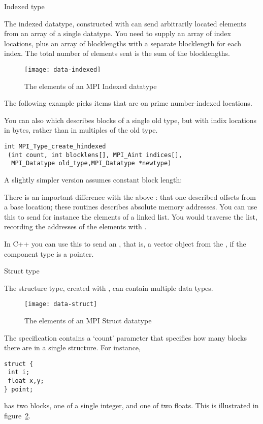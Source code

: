  {Indexed type}
\label{sec:data:indexed}

The indexed datatype, constructed with 
can send arbitrarily located elements from an array of a single datatype.
You need to supply an array of index locations, plus an array of blocklengths
with a separate blocklength for each index. The total number of elements sent
is the sum of the blocklengths.
%
%

\begin{figure}[ht]
  \texttt{[image: data-indexed]}
  \caption{The elements of an MPI Indexed datatype}
  \label{fig:data-indexed}
\end{figure}

The following example picks items that are on prime number-indexed
locations.
%
%

You can also  which describes blocks
of a single old type, but with indix locations in bytes, rather than
in multiples of the old type.
\begin{lstlisting}
int MPI_Type_create_hindexed
 (int count, int blocklens[], MPI_Aint indices[],
  MPI_Datatype old_type,MPI_Datatype *newtype)
\end{lstlisting}
A slightly simpler version assumes constant block length:
%

There is an important difference with the above :
that one described offsets from a base location; these routines
describes absolute memory addresses.
You can use this to send for instance the elements of a
linked list. You would traverse the list, recording the addresses of
the elements with .


In C++ you can use this to
send an , that
is, a vector object from the , if
the component type is a pointer.

 {Struct type}
\label{sec:data:struct}

The structure type, created with ,
can contain multiple data types.
%
\begin{figure}[ht]
  \texttt{[image: data-struct]}
  \caption{The elements of an MPI Struct datatype}
  \label{fig:data-struct}
\end{figure}
%
The specification contains a `count' parameter that specifies how many blocks
there are in a single structure. For instance,
\begin{lstlisting}
struct {
 int i;
 float x,y;
} point;
\end{lstlisting}
has two blocks, one of a single integer, and one of two floats.
This is illustrated in figure~\ref{fig:data-struct}.


